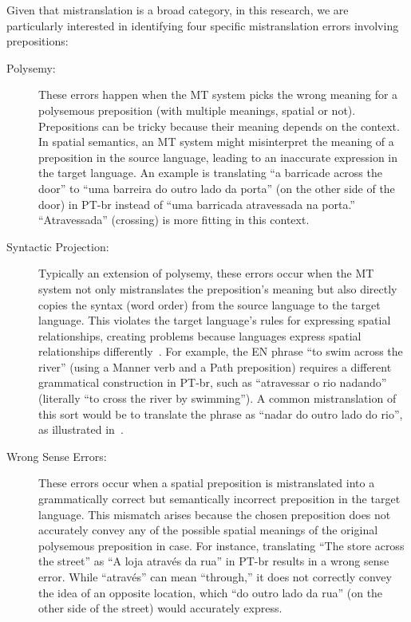 Given that mistranslation is a broad category, in this research, we are particularly
interested in identifying four specific mistranslation errors involving prepositions:

\begin{description}
    \item[Polysemy:] These errors happen when the MT system picks the wrong meaning 
    for a polysemous preposition (with multiple 
    meanings, spatial or not). Prepositions can be tricky because their meaning depends on the context. In spatial semantics, an MT system might misinterpret the 
    meaning of a preposition in the source language, leading to an inaccurate expression in the target language. An example is translating ``a barricade across the door'' to ``uma barreira do outro lado da porta'' (on the other side of the door) in PT-br instead of ``uma barricada atravessada na porta.'' ``Atravessada'' (crossing) is more fitting in this context.
    
    \item[Syntactic Projection:] Typically an extension of polysemy, these errors occur when the MT system not only mistranslates the preposition's meaning but also directly copies the syntax (word order) from the source language to the target language. This violates the target language's rules for expressing spatial relationships, creating problems because languages express spatial relationships differently~\parencite{talmy2000toward, talmy2000towardb, slobin2005relating}. For example, the EN phrase ``to swim across the river'' (using a Manner verb and a Path preposition) requires a different grammatical construction in PT-br, such as ``atravessar o rio nadando'' (literally ``to cross the river by swimming''). A common mistranslation of this sort would be to translate the phrase as ``nadar do outro lado do rio'', as illustrated in~\textcite{fernandes-etal-2024-spatial}. 
    
    \item[Wrong Sense Errors:] These errors occur when a spatial preposition is mistranslated into a grammatically correct but semantically %
    incorrect
    preposition in the target language. This mismatch arises because the chosen preposition does not accurately convey any of the possible spatial meanings of the original polysemous preposition in case. For instance, translating ``The store across the street'' as ``A loja através da rua'' in PT-br results in a wrong sense error. While ``através'' can mean ``through,'' it does not correctly convey the idea of an opposite location, which ``do outro lado da rua'' (on the other side of the street) would accurately express.
    

\end{description}
